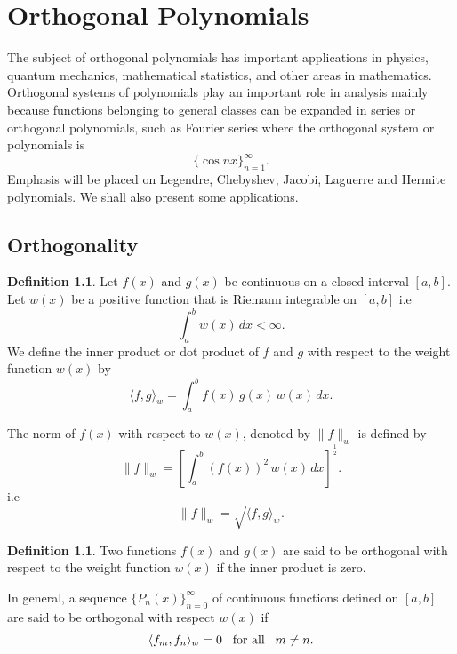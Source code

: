 \documentclass[12pt,a4paper]{report}
\theoremstyle{definition}
\newtheorem{defn}[thm]{Definition}
\theoremstyle{plain}
\begin{document}
\chapter{Orthogonal Polynomials}
\vspace*{-5pt}
The subject of orthogonal polynomials has important applications in physics, quantum mechanics, mathematical statistics, and other areas in mathematics.\\
Orthogonal systems of polynomials play an important role in analysis mainly because functions belonging to general classes can be expanded in series or orthogonal polynomials, such as Fourier series where the orthogonal system or polynomials is $$\{\cos nx\}^{\infty}_{n=1}.$$
Emphasis will be placed on Legendre, Chebyshev, Jacobi, Laguerre and Hermite polynomials.
We shall also present some applications.



\section{Orthogonality}
\begin{defn}
Let $f(x)$ and $g(x)$ be continuous on a closed interval $[a,b]$. Let $w(x)$ be a positive function that is Riemann integrable on $[a,b]$ i.e $$\int_a^bw(x)\, dx < \infty.$$ We define the inner product or dot product of $f$ and $g$ with respect to the weight function $w(x)$ by $$\langle f,g\rangle_w = \int_a^b f(x)\, g(x)\, w(x)\, dx.$$
\end{defn}






The norm of $f(x)$ with respect to $w(x)$, denoted by $\lVert f\rVert_w$ is defined by $$\lVert f\rVert_w = \left[\int_a^b(f(x))^2\, w(x)\, dx\right]^{\frac{1}{2}}.$$ i.e $$\lVert f\rVert_w = \sqrt{\langle f,g\rangle_w}.$$



\begin{defn}
Two functions $f(x)$ and $g(x)$ are said to be orthogonal with respect to the weight function $w(x)$ if the inner product is zero.
\end{defn}


In general, a sequence $\{P_n(x)\}^{\infty}_{n = 0}$ of continuous functions defined on $[a,b]$ are said to be orthogonal with respect $w(x)$ if $$\langle f_m,f_n\rangle_w = 0 \hspace{0.3cm} \text{for all}\hspace{0.3cm} m\neq n.$$
\end{document}

